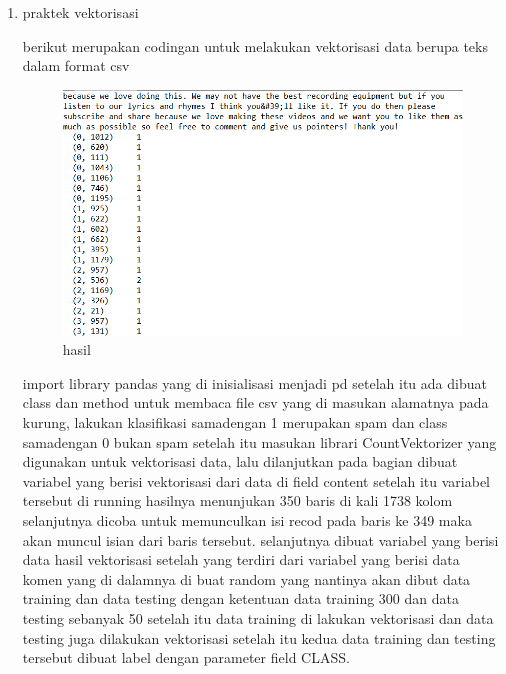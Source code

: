 \begin{enumerate}
\item praktek vektorisasi\par
berikut merupakan codingan untuk melakukan vektorisasi data berupa teks dalam format csv

\begin{figure}[ht]
\centering
\includegraphics[scale=0.5]{figures/1174050/chapter4/8.PNG}
\caption{hasil}
\label{Praktek no 3}
\end{figure}
 import library pandas yang di inisialisasi menjadi pd setelah itu ada dibuat class dan method untuk membaca file csv yang di masukan alamatnya pada kurung, lakukan klasifikasi samadengan 1 merupakan spam dan class samadengan 0 bukan spam setelah itu masukan librari CountVektorizer yang digunakan untuk vektorisasi data, lalu dilanjutkan pada bagian dibuat variabel yang berisi vektorisasi dari data di field content setelah itu variabel tersebut di running hasilnya menunjukan 350 baris di kali 1738 kolom selanjutnya dicoba untuk memunculkan isi recod pada baris ke 349 maka akan muncul isian dari baris tersebut. selanjutnya dibuat variabel yang berisi data hasil vektorisasi setelah yang terdiri dari variabel yang berisi data komen yang di dalamnya di buat random yang nantinya akan dibut data training dan data testing dengan ketentuan data training 300 dan data testing sebanyak 50 setelah itu data training di lakukan vektorisasi dan data testing juga dilakukan vektorisasi setelah itu kedua data training dan testing tersebut dibuat label dengan parameter field CLASS.


\end{enumerate}
